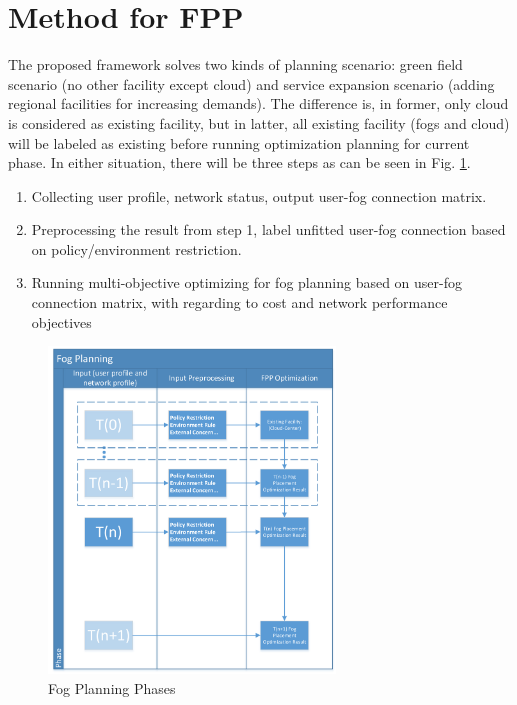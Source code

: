 \documentclass[10pt,journal,compsoc]{IEEEtran}
\begin{document}
\section{Method for FPP}
The proposed framework solves two kinds of planning scenario: green field scenario (no other facility except cloud) and service expansion scenario (adding regional facilities for increasing demands). The difference is, in former, only cloud is considered as existing facility, but in latter, all existing facility (fogs and cloud) will be labeled as existing before running optimization planning for current phase. In either situation, there will be three steps as can be seen in Fig. \ref{fpphase}. 
\begin{enumerate}
\item Collecting user profile, network status, output user-fog connection matrix.
\item Preprocessing the result from step 1, label unfitted user-fog connection based on policy/environment restriction.
\item Running multi-objective optimizing for fog planning based on user-fog connection matrix, with regarding to cost and network performance objectives 
\end{enumerate}

\begin{figure}[t]
\centerline{\includegraphics[width=3.0in]{Fogplanningmethod.png}}
\caption{Fog Planning Phases} 
\label{fpphase}
\end{figure}
\end{document}
